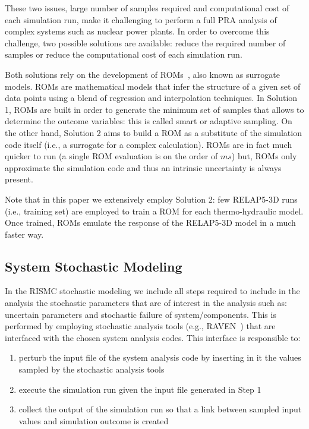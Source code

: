 These two issues, large number of samples required and computational cost of each simulation run, 
make it challenging to perform a full PRA analysis of complex systems such as nuclear power plants.  
In order to overcome this challenge, two possible solutions are available: reduce the required 
number of samples or reduce the computational cost of each simulation run.

Both solutions rely on the development of ROMs~\cite{ROM_Khalik}, also known as surrogate models. 
ROMs are mathematical models that infer the structure of a given set of data points using a
blend of regression and interpolation techniques. In Solution 1, ROMs are built in order to generate 
the minimum set of samples that allows to determine the outcome variables: this is called smart or 
adaptive sampling. On the other hand, Solution 2 aims to build a ROM as a substitute of the simulation 
code itself (i.e., a surrogate for a complex calculation).  ROMs are in fact much quicker to run 
(a single ROM evaluation is on the order of $ms$) but, ROMs only approximate the simulation code and 
thus an intrinsic uncertainty is always present.

Note that in this paper we extensively employ Solution 2: few RELAP5-3D runs (i.e., training set) are 
employed to train a ROM for each thermo-hydraulic model. Once trained, ROMs emulate the response of the 
RELAP5-3D model in a much faster way. 

\subsection{System Stochastic Modeling}
In the RISMC stochastic modeling we include all steps required to include in the analysis the 
stochastic parameters that are of interest in the analysis such as: uncertain parameters and stochastic 
failure of system/components.
This is performed by employing stochastic analysis tools (e.g., RAVEN~\cite{RAVEN_PSAM_2014}) that are 
interfaced with the chosen system analysis codes. This interface is responsible to:

\begin{enumerate}
  \item perturb the input file of the system analysis code by inserting in it the values sampled by the
        stochastic analysis tools
  \item execute the simulation run given the input file generated in Step 1
  \item collect the output of the simulation run so that a link between sampled input values and simulation 
        outcome is created      
\end{enumerate}

